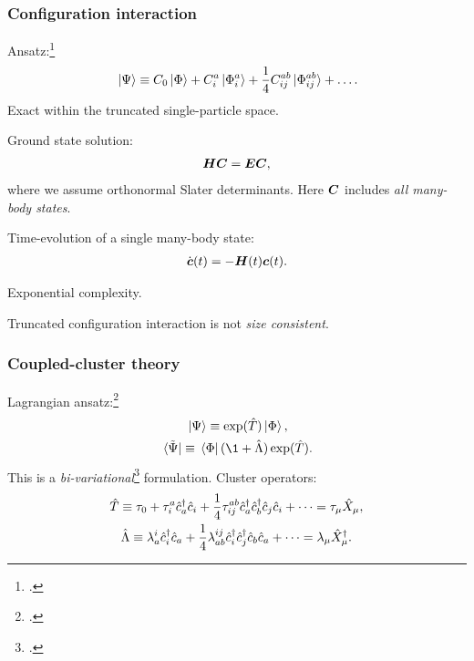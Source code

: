 \documentclass{beamer}
\begin{document}
\begin{frame}
    \frametitle{Configuration interaction}
    Ansatz:\footcite{helgaker-molecular}
    \begin{align}
        \ket*{\Psi} \equiv C_0\ket*{\Phi}
        + C^{a}_{i}\ket*{\Phi^{a}_{i}}
        + \frac{1}{4}C^{ab}_{ij}\ket*{\Phi^{ab}_{ij}}
        + \dots.
    \end{align}
    Exact within the truncated single-particle space.
\end{frame}

\begin{frame}
    Ground state solution:
    \begin{align}
        \boldsymbol{H}\boldsymbol{C} = \boldsymbol{E}\boldsymbol{C},
    \end{align}
    where we assume orthonormal Slater determinants.
    Here $\boldsymbol{C}$ includes \emph{all many-body states}.
\end{frame}

\begin{frame}
    Time-evolution of a single many-body state:
    \begin{align}
        \dot{\boldsymbol{c}}(t) = -\boldsymbol{H}(t)\boldsymbol{c}(t).
    \end{align}
\end{frame}

\begin{frame}
    Exponential complexity.

    Truncated configuration interaction is not \emph{size consistent}.
\end{frame}

\begin{frame}
    \frametitle{Coupled-cluster theory}
    Lagrangian ansatz:\footcite{helgaker1989}
    \begin{gather}
        \ket*{\Psi} \equiv \exponential(\clust)\ket*{\slat},
        \\
        \bra*{\tilde{\Psi}} \equiv
        \bra*{\slat}(\1 + \clustl)\exponential(\clust).
    \end{gather}
    This is a \emph{bi-variational}\footcite{arponen1983311} formulation.
    Cluster operators:
    \begin{gather}
        \hat{T} \equiv \tau_0
        + \tau^{a}_{i}\hat{c}_{a}^{\dagger}\hat{c}_{i}
        + \frac{1}{4}\tau^{ab}_{ij}\hat{c}_{a}^{\dagger}\hat{c}_{b}^{\dagger}\hat{c}_{j}\hat{c}_{i}
        + \dots
        = \tau_{\mu}\hat{X}_{\mu},
        \\
        \hat{\Lambda} \equiv
        \lambda^{i}_{a}\hat{c}_{i}^{\dagger}\hat{c}_{a}
        + \frac{1}{4}\lambda^{ij}_{ab}\hat{c}_{i}^{\dagger}\hat{c}_{j}^{\dagger}\hat{c}_{b}\hat{c}_{a}
        + \dots
        = \lambda_{\mu}\hat{X}^{\dagger}_{\mu}.
    \end{gather}
\end{frame}
\end{document}
